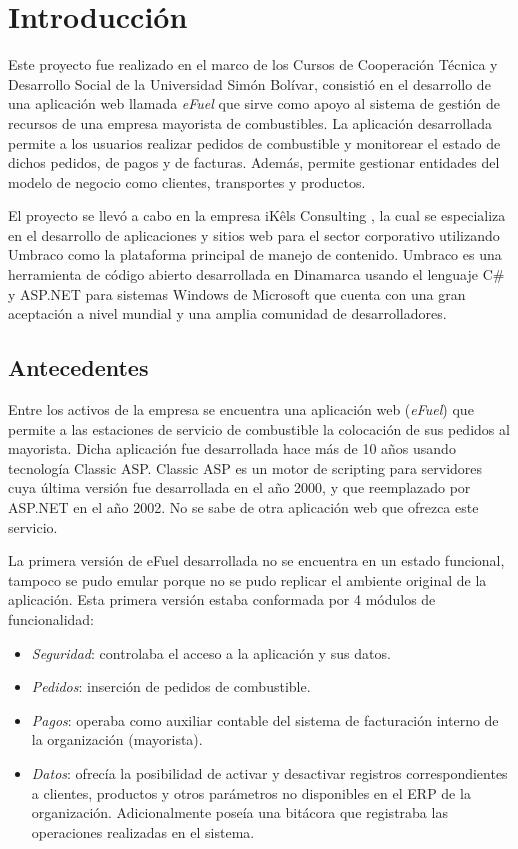 \chapter*{Introducción}

Este proyecto fue realizado en el marco de los Cursos de Cooperación Técnica y Desarrollo Social de la Universidad Simón Bolívar, consistió en el desarrollo de una aplicación web llamada \emph{eFuel} que sirve como apoyo al sistema de gestión de recursos de una empresa mayorista de combustibles. La aplicación desarrollada permite a los usuarios realizar pedidos de combustible y monitorear el estado de dichos pedidos, de pagos y de facturas. Además, permite gestionar entidades del modelo de negocio como clientes, transportes y productos.

El proyecto se llevó a cabo en la empresa iKêls Consulting \cite{ikelsAbout}, la cual se especializa en el desarrollo de aplicaciones y sitios web para el sector corporativo utilizando Umbraco como la plataforma principal de manejo de  contenido. Umbraco es una herramienta de código abierto desarrollada en Dinamarca usando el lenguaje C\# \cite{cSharpMicrosoft} y ASP.NET \cite{asp.netMicrosoft} para sistemas Windows de Microsoft que cuenta con una gran aceptación a nivel mundial y una amplia comunidad de desarrolladores.

\section*{Antecedentes}
Entre los activos de la empresa se encuentra una aplicación web (\emph{eFuel}) que permite a las estaciones de servicio de combustible la colocación de sus pedidos al mayorista. Dicha aplicación fue desarrollada hace más de 10 años usando tecnología Classic ASP. Classic ASP es un motor de scripting para servidores cuya última versión fue desarrollada en el año 2000, y que reemplazado por ASP.NET en el año 2002. No se sabe de otra aplicación web que ofrezca este servicio.

La primera versión de eFuel desarrollada no se encuentra en un estado funcional, tampoco se pudo emular porque no se pudo replicar el ambiente original de la aplicación. Esta primera versión estaba conformada por 4 módulos de funcionalidad:

\begin{itemize}
    \item \emph{Seguridad}: controlaba el acceso a la aplicación y sus datos.
    \item \emph{Pedidos}: inserción de pedidos de combustible.
    \item \emph{Pagos}: operaba como auxiliar contable del sistema de facturación interno de la organización (mayorista). 
    \item \emph{Datos}: ofrecía la posibilidad de activar y desactivar registros correspondientes a clientes, productos y otros parámetros no disponibles en el \ac{ERP} de la organización. Adicionalmente poseía una bitácora que registraba las operaciones realizadas en el sistema.
\end{itemize}

